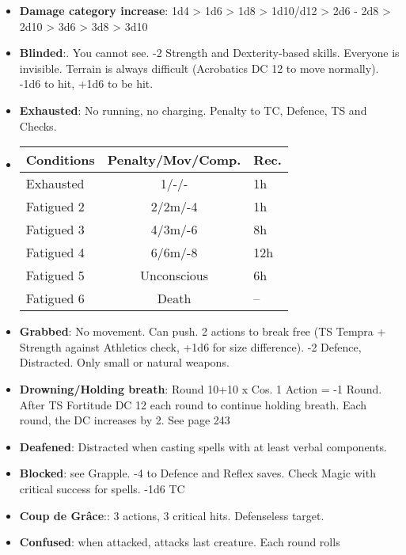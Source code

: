 \documentclass[landscape,10pt,a4paper]{article}
\begin{document}
\pagestyle{empty}



\begin{multicols}{3}

\footnotesize

\begin{dmbox}[title=Conditions - page \pageref{conditions}]

\begin{itemize}[leftmargin=0.5cm,itemsep=-1pt,parsep=0pt]
\item \textbf{Damage category increase}: 1d4 > 1d6 > 1d8 > 1d10/d12 > 2d6 - 2d8 > 2d10 > 3d6 > 3d8 > 3d10
\item \textbf{Blinded}:. You cannot see. -2 Strength and Dexterity-based skills. Everyone is invisible. Terrain is always difficult (Acrobatics DC 12 to move normally). -1d6 to hit, +1d6 to be hit.
\item \textbf{Exhausted}: No running, no charging. Penalty to TC, Defence, TS and Checks.
\item
\begin{tabular}{lcl}
\textbf{Conditions}& \textbf{Penalty/Mov/Comp.}&\textbf{Rec.}\\
\hline
Exhausted &1/-/-&1h\\
Fatigued 2&2/2m/-4&1h\\
Fatigued 3&4/3m/-6&8h\\
Fatigued 4&6/6m/-8&12h\\
Fatigued 5&Unconscious&6h\\
Fatigued 6&Death&--
\end{tabular}
\item \textbf{Grabbed}: No movement. Can push. 2 actions to break free (TS Tempra + Strength against Athletics check, +1d6 for size difference). -2 Defence, Distracted. Only small or natural weapons.
\item \textbf{Drowning/Holding breath}: Round 10+10 x Cos. 1 Action = -1 Round. After TS Fortitude DC 12 each round to continue holding breath. Each round, the DC increases by 2. See page 243
\item \textbf{Deafened}: Distracted when casting spells with at least verbal components.
\item \textbf{Blocked}: see Grapple. -4 to Defence and Reflex saves. Check Magic with critical success for spells. -1d6 TC
\item \textbf{Coup de Grâce}:: 3 actions, 3 critical hits. Defenseless target.
\item \textbf{Confused}: when attacked, attacks last creature. Each round rolls


\end{itemize}
\end{dmbox}
\end{multicols}
\end{document}
